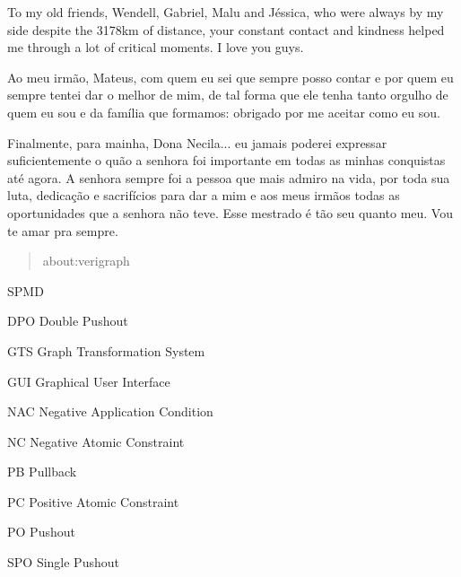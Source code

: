 \documentclass[ppgc,diss,english,openright]{iiufrgs}
\theoremstyle{plain}
\theoremstyle{definition}
\begin{document}
  To my old friends, Wendell, Gabriel, Malu and Jéssica, who were always by my side despite the 3178km of distance, your constant contact and kindness helped me through a lot of critical moments. I love you guys.

  Ao meu irmão, Mateus, com quem eu sei que sempre posso contar e por quem eu sempre tentei dar o melhor de mim, de tal forma que ele tenha tanto orgulho de quem eu sou e da família que formamos: obrigado por me aceitar como eu sou.
  
  Finalmente, para mainha, Dona Necila... eu jamais poderei expressar suficientemente o quão a senhora foi importante em todas as minhas conquistas até agora. A senhora sempre foi a pessoa que mais admiro na vida, por toda sua luta, dedicação e sacrifícios para dar a mim e aos meus irmãos todas as oportunidades que a senhora não teve. Esse mestrado é tão seu quanto meu. Vou te amar pra sempre.

\begin{abstract}
  about:verigraph
\end{abstract}

\begin{listofabbrv}{SPMD}
   \item[DPO] Double Pushout
   \item[GTS] Graph Transformation System
   \item[GUI] Graphical User Interface
   \item[NAC] Negative Application Condition
   \item[NC] Negative Atomic Constraint
   \item[PB] Pullback
   \item[PC] Positive Atomic Constraint
   \item[PO] Pushout
   \item[SPO] Single Pushout
\end{listofabbrv}


\listoffigures
\tableofcontents



%





\end{document}
